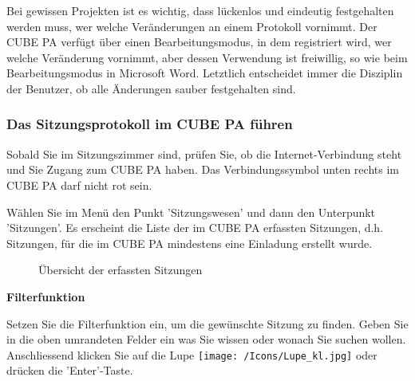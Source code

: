 Bei gewissen Projekten ist es wichtig, dass lückenlos und eindeutig festgehalten werden muss, wer welche Veränderungen an einem Protokoll vornimmt. Der CUBE PA verfügt über einen Bearbeitungsmodus, in dem registriert wird, wer welche Veränderung vornimmt, aber dessen Verwendung ist freiwillig, so wie beim Bearbeitungsmodus in Microsoft Word. Letztlich
entscheidet immer die Disziplin der Benutzer, ob alle Änderungen sauber festgehalten sind.

\subsubsection{Das Sitzungsprotokoll im CUBE PA führen}

Sobald Sie im Sitzungszimmer sind, prüfen Sie, ob die Internet-Verbindung steht und Sie Zugang zum CUBE PA haben. Das Verbindungssymbol unten rechts im CUBE PA darf nicht rot sein.

\vspace{\baselineskip}

Wählen Sie im Menü den Punkt 'Sitzungswesen' und dann den Unterpunkt 'Sitzungen'. Es erscheint die Liste der im CUBE PA erfassten Sitzungen, d.h. Sitzungen, für die im CUBE PA mindestens eine Einladung erstellt wurde. 

\begin{figure}[H]
\caption{Übersicht der erfassten Sitzungen}
\end{figure}

\textbf{Filterfunktion }

Setzen Sie die Filterfunktion ein, um die gewünschte Sitzung zu finden. Geben Sie in die oben umrandeten Felder ein was Sie wissen oder wonach Sie suchen wollen. Anschliessend klicken Sie auf die Lupe \texttt{[image: /Icons/Lupe\_kl.jpg]} oder drücken die 'Enter'-Taste.

\vspace{\baselineskip}

